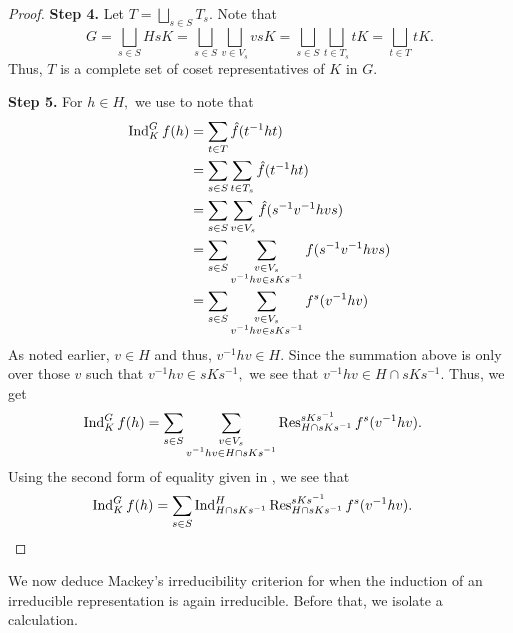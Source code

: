 \begin{proof}
	\textbf{Step 4.} Let $T = \bigsqcup_{s \in S}T_s.$ Note that
	\begin{equation*} 
		G = \bigsqcup_{s \in S}HsK = \bigsqcup_{s \in S}\bigsqcup_{v \in V_s}vsK = \bigsqcup_{s \in S}\bigsqcup_{t \in T_s}tK = \bigsqcup_{t \in T}tK.
	\end{equation*}
	Thus, $T$ is a complete set of coset representatives of $K$ in $G.$

	\textbf{Step 5.} For $h \in H,$ we use  to note that
	\begin{align*} 
		\operatorname{Ind}^{G}_{K}f(h) &= \sum_{t \in T} \hat{f}(t^{-1}ht)\\
		&= \sum_{s \in S}\sum_{t \in T_s} \hat{f}(t^{-1}ht)\\
		&= \sum_{s \in S}\sum_{v \in V_s} \hat{f}(s^{-1}v^{-1}hvs)\\
		&= \sum_{s \in S}\sum_{\substack{v \in V_s \\ v^{-1}hv \in sKs^{-1}}} f(s^{-1}v^{-1}hvs)\\	
		&= \sum_{s \in S}\sum_{\substack{v \in V_s \\ v^{-1}hv \in sKs^{-1}}} f^s(v^{-1}hv)
	\end{align*}
	As noted earlier, $v \in H$ and thus, $v^{-1}hv \in H.$ Since the summation above is only over those $v$ such that $v^{-1}hv \in sKs^{-1},$ we see that $v^{-1}hv \in H \cap sKs^{-1}.$ Thus, we get
	\begin{align*} 
		\operatorname{Ind}^{G}_{K}f(h) &= \sum_{s \in S}\sum_{\substack{v \in V_s \\ v^{-1}hv \in H \cap sKs^{-1}}} \operatorname{Res}^{sKs^{-1}}_{H \cap sKs^{-1}}f^s(v^{-1}hv).
	\end{align*}
	Using the second form of equality given in , we see that 
	\begin{align*} 
		\operatorname{Ind}^{G}_{K}f(h) &= \sum_{s \in S}\operatorname{Ind}^{H}_{H \cap sKs^{-1}} \operatorname{Res}^{sKs^{-1}}_{H \cap sKs^{-1}}f^s(v^{-1}hv). \qedhere
	\end{align*}
\end{proof}

We now deduce Mackey's irreducibility criterion for when the induction of an irreducible representation is again irreducible. Before that, we isolate a calculation.

